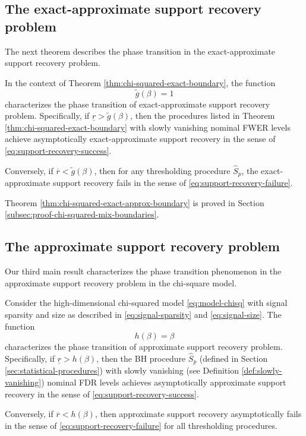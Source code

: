 \subsection{The exact-approximate support recovery problem}
\label{subsec:exact-approx-support-recovery-chisq}

The next theorem describes the phase transition in the exact-approximate support recovery problem.

\begin{theorem} \label{thm:chi-squared-exact-approx-boundary}
In the context of Theorem \ref{thm:chi-squared-exact-boundary}, 
the function 
\begin{equation} \label{eq:exact-approx-boundary-chisquared}
    \widetilde{g}(\beta) = 1
\end{equation}
characterizes the phase transition of exact-approximate support recovery problem.
Specifically, if $\underline{r} > \widetilde{g}(\beta)$, then the procedures listed in Theorem \ref{thm:chi-squared-exact-boundary} with slowly vanishing nominal FWER levels achieve asymptotically exact-approximate support recovery in the sense of \eqref{eq:support-recovery-success}. 

Conversely, if $\overline{r} < \widetilde{g}(\beta)$, then for any thresholding procedure $\widehat{S}_p$, the exact-approximate support recovery fails in the sense of \eqref{eq:support-recovery-failure}.
\end{theorem}

Theorem \ref{thm:chi-squared-exact-approx-boundary} is proved in Section \ref{subsec:proof-chi-squared-mix-boundaries}. 


\subsection{The approximate support recovery problem}
\label{subsec:approx-support-recovery-chisq}

Our third main result characterizes the phase transition phenomenon in the approximate support recovery problem in the chi-square model.

\begin{theorem} \label{thm:chi-squared-approx-boundary}
Consider the high-dimensional chi-squared model \eqref{eq:model-chisq} with signal sparsity and size as described in \eqref{eq:signal-sparsity} and \eqref{eq:signal-size}.
The function 
\begin{equation} \label{eq:approx-boundary-chisquared}
    h(\beta) = \beta
\end{equation}
characterizes the phase transition of approximate support recovery problem.
Specifically, if $\underline{r} > {h}(\beta)$, then the \ac{BH} procedure $\widehat{S}_p$ (defined in Section \ref{sec:statistical-procedures}) with slowly vanishing (see Definition \ref{def:slowly-vanishing}) nominal FDR levels achieves asymptotically approximate support recovery in the sense of \eqref{eq:support-recovery-success}. 

Conversely, if $\overline{r} < {h}(\beta)$, then approximate support recovery asymptotically fails in the sense of \eqref{eq:support-recovery-failure} for all thresholding procedures.
\end{theorem}

